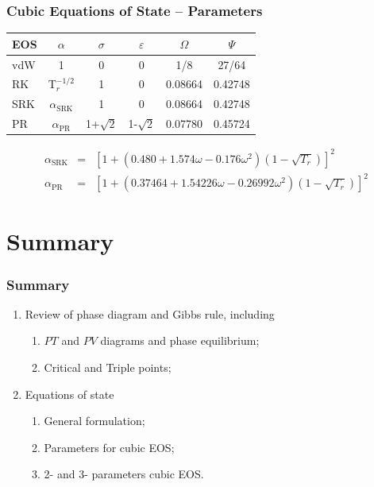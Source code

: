 \documentclass[10pt,compress]{beamer}
\begin{document}
\begin{frame}
 \frametitle{Cubic Equations of State -- Parameters}
    \begin{center}
       \begin{tabular}{| l | c c c c c| }
       \hline
          {\bf EOS}  & {\bf $\alpha$} & {\bf $\sigma$}  & {\bf $\varepsilon$} & {\bf $\Omega$} & {\bf $\Psi$ } \\
       \hline
            vdW      & 1              & 0               & 0                  & 1/8            & 27/64          \\
            RK       & T$_{r}^{-1/2}$  & 1                & 0                  & 0.08664       & 0.42748        \\
           SRK       &$\alpha_{\text{SRK}}$& 1            & 0                   & 0.08664       & 0.42748        \\
            PR       &$\alpha_{\text{PR}}$& 1+$\sqrt{2}$   & 1-$\sqrt{2}$        & 0.07780        & 0.45724  \\
       \hline
       \end{tabular}
    \end{center}
\begin{eqnarray}
\alpha_{\text{SRK}} &=& \left[ 1 + \left( 0.480 + 1.574 \omega - 0.176\omega^{2}\right)\left(1-\sqrt{T_{r}}\right)\right]^{2} \nonumber \\
\alpha_{\text{PR}} &=& \left[ 1 + \left( 0.37464 + 1.54226 \omega - 0.26992\omega^{2}\right)\left(1-\sqrt{T_{r}}\right)\right]^{2} \nonumber
\end{eqnarray}

\end{frame}
\normalsize

\section{Summary}

\begin{frame}
 \frametitle{Summary}
   \begin{enumerate}
     \item Review of phase diagram and Gibbs rule, including
       \begin{enumerate}
         \item $PT$ and $PV$ diagrams and phase equilibrium;
         \item Critical and Triple points;
       \end{enumerate}
     \item Equations of state
       \begin{enumerate}
         \item General formulation;
         \item Parameters for cubic EOS;
         \item 2- and 3- parameters cubic EOS.
       \end{enumerate}
   \end{enumerate}
\end{frame}
\end{document}
